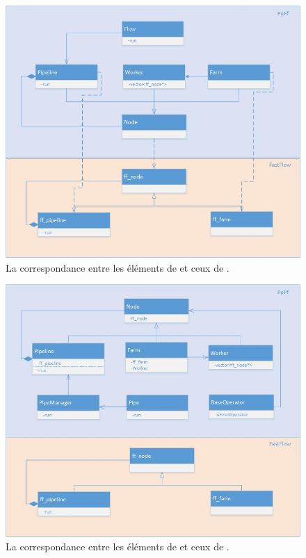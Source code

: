 \begin{figure}[ht]
\centering
     \includegraphics[width=1.0\textwidth]{Figures/CorrespondencePpFfToFastFlow.jpg}
      \caption{La correspondance entre les \'el\'ements de  et ceux de  .}
       \label{CorrespondencePpFfToFastFlow.fig}
\end{figure}


\begin{figure}[ht]
\centering
     \includegraphics[width=1.0\textwidth]{Figures/MapToFastFlow.jpg}
      \caption{La correspondance entre les \'el\'ements de  et ceux de  .}
       \label{MapToFastFlow.fig}
\end{figure}


